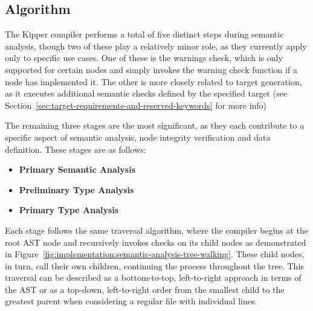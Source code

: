 \subsection{Algorithm}

The Kipper compiler performs a total of five distinct steps during semantic analysis, though two of these play a relatively minor role, as they currently apply only to specific use cases. One of these is the warnings check, which is only supported for certain nodes and simply invokes the warning check function if a node has implemented it. The other is more closely related to target generation, as it executes additional semantic checks defined by the specified target (see Section~\ref{sec:target-requirements-and-reserved-keywords} for more info)

The remaining three stages are the most significant, as they each contribute to a specific aspect of semantic analysis, node integrity verification and data definition. These stages are as follows:

\begin{itemize}
	\item \textbf{Primary Semantic Analysis}
	\item \textbf{Preliminary Type Analysis}
	\item \textbf{Primary Type Analysis}
\end{itemize}

Each stage follows the same traversal algorithm, where the compiler begins at the root AST node and recursively invokes checks on its child nodes as demonstrated in Figure~\ref{fig:implementation:semantic-analysis-tree-walking}. These child nodes, in turn, call their own children, continuing the process throughout the tree. This traversal can be described as a bottom-to-top, left-to-right approach in terms of the AST or as a top-down, left-to-right order from the smallest child to the greatest parent when considering a regular file with individual lines.

